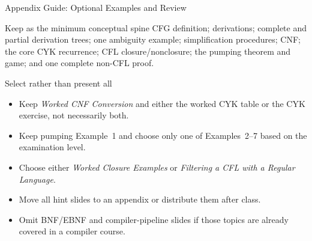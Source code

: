 \documentclass[10pt]{beamer}
\begin{document}
\begin{frame}{Appendix Guide: Optional Examples and Review}
  \footnotesize
  \begin{block}{Keep as the minimum conceptual spine}
    CFG definition; derivations; complete and partial derivation trees; one
    ambiguity example; simplification procedures; CNF; the core CYK recurrence;
    CFL closure/nonclosure; the pumping theorem and game; and one complete
    non-CFL proof.
  \end{block}
  \begin{block}{Select rather than present all}
    \begin{itemize}
      \item Keep \textit{Worked CNF Conversion} and either the worked CYK table
        or the CYK exercise, not necessarily both.
      \item Keep pumping Example~1 and choose only one of Examples~2--7 based
        on the examination level.
      \item Choose either \textit{Worked Closure Examples} or
        \textit{Filtering a CFL with a Regular Language}.
      \item Move all hint slides to an appendix or distribute them after class.
      \item Omit BNF/EBNF and compiler-pipeline slides if those topics are
        already covered in a compiler course.
    \end{itemize}
  \end{block}
\end{frame}
\end{document}
